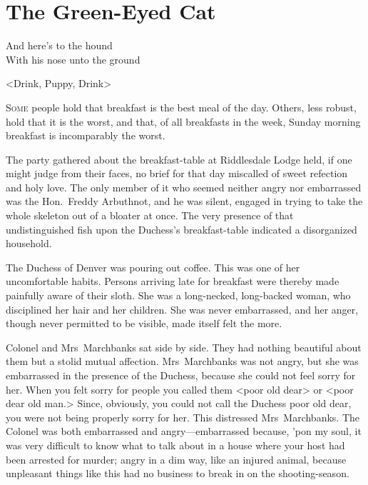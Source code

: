 

\chapter{The Green-Eyed Cat}

\epigraph{And here's to the hound\\With his nose unto the ground}{<Drink, Puppy, Drink>}


\lettrine{S}{ome} people hold that breakfast is the best meal of the day. Others, less robust, hold that it is the worst, and that, of all breakfasts in the week, Sunday morning breakfast is incomparably the worst.

\zz
The party gathered about the breakfast-table at Riddlesdale Lodge held, if one might judge from their faces, no brief for that day miscalled of sweet refection and holy love. The only member of it who seemed neither angry nor embarrassed was the Hon.~Freddy Arbuthnot, and he was silent, engaged in trying to take the whole skeleton out of a bloater at once.  The very presence of that undistinguished fish upon the Duchess's breakfast-table indicated a disorganized household.

The Duchess of Denver was pouring out coffee. This was one of her uncomfortable habits. Persons arriving late for breakfast were thereby made painfully aware of their sloth. She was a long-necked, long-backed woman, who disciplined her hair and her children. She was never embarrassed, and her anger, though never permitted to be visible, made itself felt the more.

Colonel and Mrs~Marchbanks sat side by side. They had nothing beautiful about them but a stolid mutual affection. Mrs~Marchbanks was not angry, but she was embarrassed in the presence of the Duchess, because she could not feel sorry for her. When you felt sorry for people you called them <poor old dear> or <poor dear old man.> Since, obviously, you could not call the Duchess poor old dear, you were not being properly sorry for her. This distressed Mrs~Marchbanks. The Colonel was both embarrassed and angry—embarrassed because, 'pon my soul, it was very difficult to know what to talk about in a house where your host had been arrested for murder; angry in a dim way, like an injured animal, because unpleasant things like this had no business to break in on the shooting-season.

